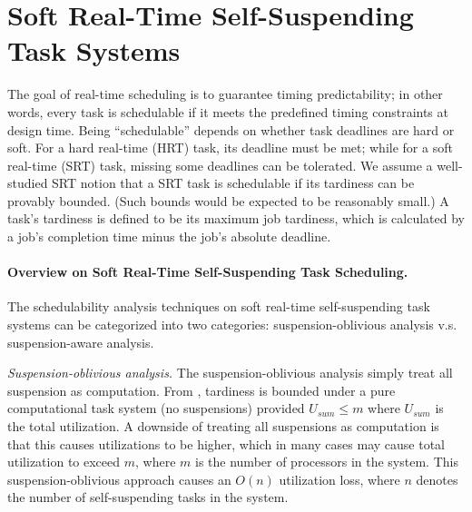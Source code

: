 \section{Soft Real-Time Self-Suspending Task Systems}

The goal of real-time scheduling is to guarantee timing predictability; in other words, every task is schedulable if it meets the predefined timing constraints at design time. Being ``schedulable'' depends on whether task deadlines are hard or soft. 
For a hard real-time (HRT) task, its deadline must be met; while for a soft real-time (SRT) task, missing some deadlines can be tolerated. We assume a well-studied SRT notion \cite{mills2010stochastic,erickson2012soft,johndissertation,BBBdissertation,devidissertation,leontyevdissertation} that a SRT task is schedulable if its tardiness can be provably bounded. (Such bounds would be expected to be reasonably small.) A task's tardiness is defined to be its maximum job tardiness, which is calculated by a job's completion time minus the job's absolute deadline.

\paragraph{Overview on Soft Real-Time Self-Suspending Task Scheduling.}
The schedulability analysis techniques on soft real-time self-suspending task systems can be categorized into two categories: suspension-oblivious analysis v.s. suspension-aware analysis.

\textit{Suspension-oblivious analysis.} The suspension-oblivious analysis simply treat all suspension as computation. From \cite{Devi2005,Leontyev072}, tardiness is bounded under a pure computational task system (no suspensions) provided $U_{sum} \leq m$ where $U_{sum}$ is the total utilization. A downside of treating all suspensions as computation is that this causes utilizations to be higher, which in many cases may cause total utilization to exceed $m$, where $m$ is the number of processors in the system.  This suspension-oblivious approach causes an $O(n)$ utilization loss, where $n$ denotes the number of self-suspending tasks in the system. 

